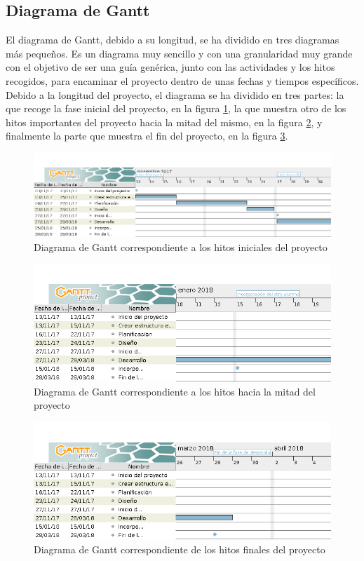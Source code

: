 \subsection{Diagrama de Gantt}
El diagrama de Gantt, debido a su longitud, se ha dividido en tres diagramas
más pequeños. Es un diagrama muy sencillo y con una granularidad muy grande
con el objetivo de ser una guía genérica, junto con las actividades y los hitos
recogidos, para encaminar el proyecto dentro de unas fechas y tiempos
específicos. Debido a la longitud del proyecto, el diagrama se ha dividido
en tres partes: la que recoge la fase inicial del proyecto, en la figura
\ref{fig:diag:start}, la que muestra otro de los hitos importantes del proyecto
hacia la mitad del mismo, en la figura \ref{fig:diag:middle}, y finalmente la
parte que muestra el fin del proyecto, en la figura \ref{fig:diag:end}.

\begin{figure}[h]
    \center
    \includegraphics[angle=90,scale=0.5]{img/gantt-start}
    \caption{Diagrama de Gantt correspondiente a los hitos iniciales del
      proyecto}
    \label{fig:diag:start}
\end{figure}

\begin{figure}[h]
    \center
    \includegraphics[angle=90,scale=0.5]{img/gantt-middle}
    \caption{Diagrama de Gantt correspondiente a los hitos hacia la mitad del
      proyecto}
    \label{fig:diag:middle}
\end{figure}

\begin{figure}[h]
    \center
    \includegraphics[angle=90,scale=0.5]{img/gantt-end}
    \caption{Diagrama de Gantt correspondiente de los hitos finales del
    proyecto}
    \label{fig:diag:end}
\end{figure}

